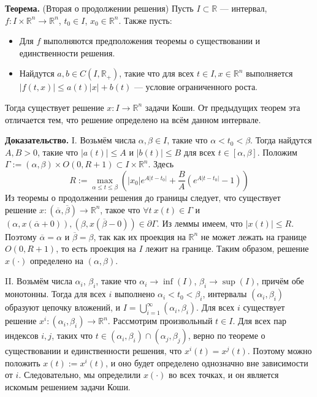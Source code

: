 \QED

\textbf{Теорема.} (Вторая о продолжении решения) Пусть $I \subset \mathbb R$ --- интервал, $f: I \times \mathbb R^n \to \mathbb R^n$, $t_0 \in I$, $x_0 \in \mathbb R^n$.
Также пусть:
\begin{itemize}
    \item Для $f$ выполняются предположения теоремы о существовании и единственности решения.
    \item Найдутся $a, b \in C(I, \mathbb R_+)$, такие что для всех $t \in I, x \in \mathbb R^n$ выполняется $|f(t, x)| \le a(t)|x| + b(t)$ --- условие ограниченного роста.
\end{itemize}
Тогда существует решение $x: I \to \mathbb R^n$ задачи Коши.
От предыдущих теорем эта отличается тем, что решение определено на всём данном интервале.

\textbf{Доказательство.} I. Возьмём числа $\alpha, \beta \in I$, такие что $\alpha < t_0 < \beta$.
Тогда найдутся $A, B > 0$, такие что $|a(t)| \le A$ и $|b(t)| \le B$ для всех $t \in [\alpha, \beta]$.
Положим $\Gamma := (\alpha, \beta) \times O(0, R + 1) \subset I \times \mathbb R^n$.
Здесь
\[
    R := \max_{\alpha \le t \le \beta} \left( |x_0|e^{A|t - t_0|} + \frac{B}{A} \left( e^{A|t - t_0|} - 1 \right) \right)
\]
Из теоремы о продолжении решения до границы следует, что существует решение $x: (\overline{\alpha}, \overline{\beta}) \to \mathbb R^n$, такое что $\forall t~x(t) \in \Gamma$ и $(\alpha, x(\overline{\alpha} + 0)), (\beta, x(\overline{\beta} - 0)) \in \partial \Gamma$.
Из леммы имеем, что $|x(t)| \le R$.
Поэтому $\overline{\alpha} = \alpha$ и $\overline{\beta} = \beta$, так как их проекция на $\mathbb R^n$ не может лежать на границе $O(0, R + 1)$, то есть проекция на $I$ лежит на границе.
Таким образом, решение $x(\cdot)$ определено на $(\alpha, \beta)$.

II. Возьмём числа $\alpha_i$, $\beta_i$, такие что $\alpha_i \to \inf(I)$, $\beta_i \to \sup(I)$, причём обе монотонны.
Тогда для всех $i$ выполнено $\alpha_i < t_0 < \beta_i$, интервалы $(\alpha_i, \beta_i)$ образуют цепочку вложений, и $I = \bigcup_{i=1}^\infty (\alpha_i, \beta_i)$.
Для всех $i$ существует решение $x^i: (\alpha_i, \beta_i) \to \mathbb R^n$.
Рассмотрим произвольный $t \in I$. Для всех пар индексов $i, j$, таких что $t \in (\alpha_i, \beta_i) \cap (\alpha_j, \beta_j)$, верно по теореме о существовании и единственности решения, что $x^i(t) = x^j(t)$.
Поэтому можно положить $x(t) := x^i(t)$, и оно будет определено однозначно вне зависимости от $i$.
Следовательно, мы определили $x(\cdot)$ во всех точках, и он является искомым решением задачи Коши.

